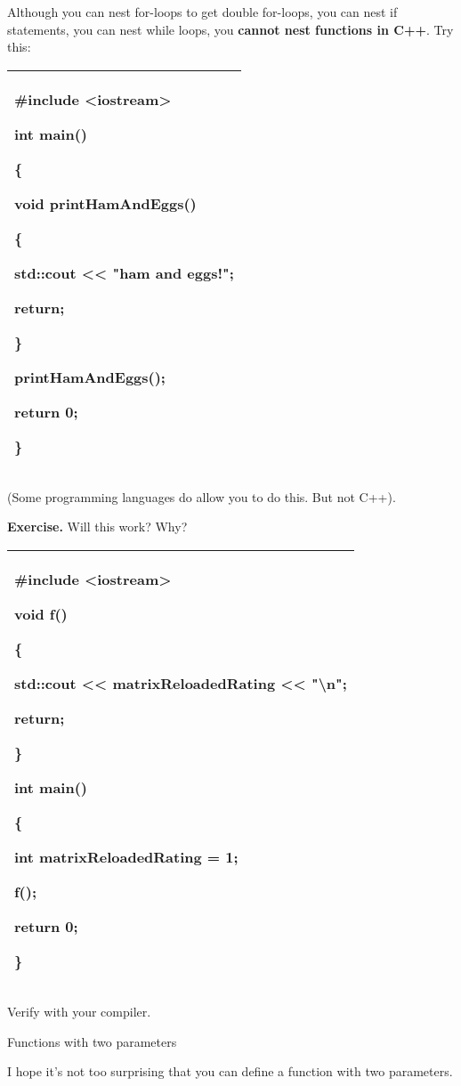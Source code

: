 \documentclass[
]{article}
\begin{document}
Although you can nest for-loops to get double for-loops, you can nest if
statements, you can nest while loops, you \textbf{cannot nest functions
in C++}. Try this:

\begin{longtable}[]{@{}l@{}}
\toprule
\endhead
\begin{minipage}[t]{0.97\columnwidth}\raggedright
\#include \textless iostream\textgreater{}

int main()

\{

void printHamAndEggs()

\{

std::cout \textless\textless{} "ham and eggs!";

return;

\}

printHamAndEggs();

return 0;

\}\strut
\end{minipage}\tabularnewline
\bottomrule
\end{longtable}

(Some programming languages do allow you to do this. But not C++).

\textbf{Exercise.} Will this work? Why?

\begin{longtable}[]{@{}l@{}}
\toprule
\endhead
\begin{minipage}[t]{0.97\columnwidth}\raggedright
\#include \textless iostream\textgreater{}

void f()

\{

std::cout \textless\textless{} matrixReloadedRating \textless\textless{}
"\textbackslash n";

return;

\}

int main()

\{

int matrixReloadedRating = 1;

f();

return 0;

\}\strut
\end{minipage}\tabularnewline
\bottomrule
\end{longtable}

Verify with your compiler.

Functions with two parameters

I hope it's not too surprising that you can define a function with two
parameters.
\end{document}

